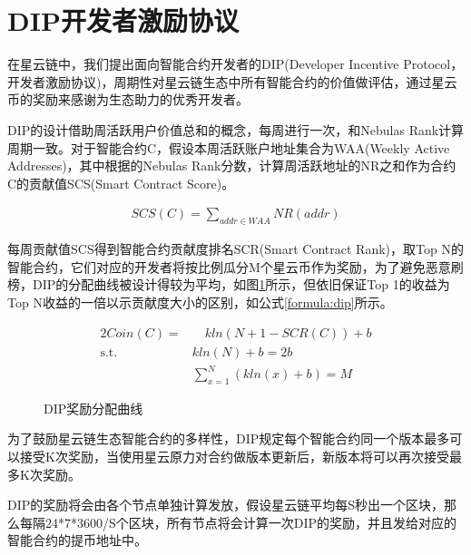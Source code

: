 \section{DIP开发者激励协议}
\label{sec:dip}

在星云链中，我们提出面向智能合约开发者的DIP(Developer Incentive Protocol，开发者激励协议)，周期性对星云链生态中所有智能合约的价值做评估，通过星云币的奖励来感谢为生态助力的优秀开发者。

DIP的设计借助周活跃用户价值总和的概念，每周进行一次，和Nebulas Rank计算周期一致。对于智能合约C，假设本周活跃账户地址集合为WAA(Weekly Active Addresses)，其中根据的Nebulas Rank分数，计算周活跃地址的NR之和作为合约C的贡献值SCS(Smart Contract Score)。

\begin{align}
SCS(C)=\sum_{addr \in WAA}NR(addr)
\end{align}

每周贡献值SCS得到智能合约贡献度排名SCR(Smart Contract Rank)，取Top N的智能合约，它们对应的开发者将按比例瓜分M个星云币作为奖励，为了避免恶意刷榜，DIP的分配曲线被设计得较为平均，如图\ref{fig:dip}所示，但依旧保证Top 1的收益为Top N收益的一倍以示贡献度大小的区别，如公式\ref{formula:dip}所示。

\begin{alignat}{2}
Coin(C) = & \quad kln(N+1-SCR(C))+b \label{formula:dip} \\
\mbox{s.t.}\quad & kln(N) + b = 2b \nonumber \\
& \sum_{x=1}^{N}(kln(x) + b) = M \nonumber
\end{alignat}

\begin{figure}[h] 
\centering
{}
\label{fig:dip}
\caption{DIP奖励分配曲线}
\end{figure}

为了鼓励星云链生态智能合约的多样性，DIP规定每个智能合约同一个版本最多可以接受K次奖励，当使用星云原力对合约做版本更新后，新版本将可以再次接受最多K次奖励。

DIP的奖励将会由各个节点单独计算发放，假设星云链平均每S秒出一个区块，那么每隔24*7*3600/S个区块，所有节点将会计算一次DIP的奖励，并且发给对应的智能合约的提币地址中。
